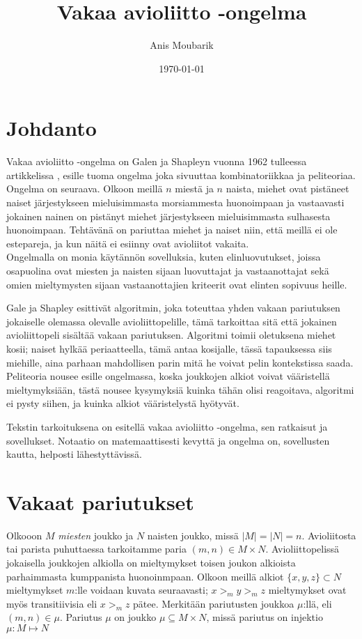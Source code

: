 \documentclass[finnish]{tktltiki2}
\title{Vakaa avioliitto -ongelma}
\author{Anis Moubarik}
\date{\today}
\theoremstyle{definition}
\theoremstyle{remark}
\begin{document}

\maketitle        %
\newpage          %



\section{Johdanto}
Vakaa avioliitto -ongelma on Galen ja Shapleyn vuonna 1962 tulleessa artikkelissa \cite{gale62a}, esille tuoma ongelma joka sivuuttaa kombinatoriikkaa ja peliteoriaa. Ongelma on seuraava. Olkoon meillä $n$ miestä ja $n$ naista, miehet ovat pistäneet naiset järjestykseen mieluisimmasta morsiammesta huonoimpaan ja vastaavasti jokainen nainen on pistänyt miehet järjestykseen mieluisimmasta sulhasesta huonoimpaan. Tehtävänä on pariuttaa miehet ja naiset niin, että meillä ei ole estepareja, ja kun näitä ei esiinny ovat avioliitot vakaita.\\
Ongelmalla on monia käytännön sovelluksia, kuten elinluovutukset, joissa osapuolina ovat miesten ja naisten sijaan luovuttajat ja vastaanottajat sekä omien mieltymysten sijaan vastaanottajien kriteerit ovat elinten sopivuus heille. 

Gale ja Shapley esittivät algoritmin, joka toteuttaa yhden vakaan pariutuksen jokaiselle olemassa olevalle avioliittopelille, tämä tarkoittaa sitä että jokainen avioliittopeli sisältää vakaan pariutuksen. Algoritmi toimii oletuksena miehet kosii; naiset hylkää periaatteella, tämä antaa kosijalle, tässä tapauksessa siis miehille, aina parhaan mahdollisen parin mitä he voivat pelin kontekstissa saada.
Peliteoria nousee esille ongelmassa, koska joukkojen alkiot voivat vääristellä mieltymyksiään, tästä nousee kysymyksiä kuinka tähän olisi reagoitava, algoritmi ei pysty siihen, ja kuinka alkiot vääristelystä hyötyvät.

Tekstin tarkoituksena on esitellä vakaa avioliitto -ongelma, sen ratkaisut ja sovellukset. Notaatio on matemaattisesti kevyttä ja ongelma on, sovellusten kautta, helposti lähestyttävissä.

\section{Vakaat pariutukset}
Olkooon $M$ \emph{miesten} joukko ja $N$ naisten joukko, missä $|M| = |N| = n$. Avioliitosta tai parista puhuttaessa tarkoitamme paria $(m, n) \in M \times N$. Avioliittopelissä jokaisella joukkojen alkiolla on mieltymykset toisen joukon alkioista parhaimmasta kumppanista huonoinmpaan. Olkoon meillä alkiot $\{x, y, z\} \subset N$ mieltymykset $m$:lle voidaan kuvata seuraavasti; $x >_m y >_m z$ mieltymykset ovat myös transitiivisia eli $x >_m z$ pätee. Merkitään pariutusten joukkoa $\mu$:llä, eli $(m,n) \in \mu$. Pariutus $\mu$ on joukko $\mu \subseteq M \times N$, missä pariutus on injektio $\mu : M \mapsto N$
\end{document}
